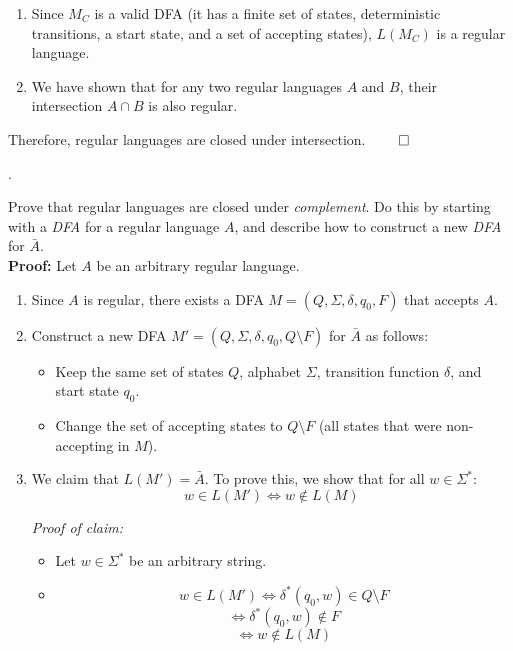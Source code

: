 \documentclass[12pt]{article}
\newcounter{quesnum}
\newcommand{\question}[2][??]{
\begin{list}{\labelitemi}{\leftmargin=2em}
\item [\arabic{quesnum}.] {} {#2}
\end{list}
\addtocounter{quesnum}{1}
}
\begin{document}
{\begin{enumerate}
    \item Since $M_C$ is a valid DFA (it has a finite set of states, deterministic transitions, a start state, and a set of accepting states), $L(M_C)$ is a regular language.
    
    \item We have shown that for any two regular languages $A$ and $B$, their intersection $A \cap B$ is also regular.
\end{enumerate}

Therefore, regular languages are closed under intersection. $\qed$
}


\vspace{12pt}

\question[3]{
Prove that regular languages are closed under \emph{complement}. Do this by starting with a \emph{DFA} for a regular language $A$, and describe how to construct a new \emph{DFA} for $\bar{A}$.
\\

\textbf{Proof:}  
Let $A$ be an arbitrary regular language.

\begin{enumerate}
    \item Since $A$ is regular, there exists a DFA $M = (Q, \Sigma, \delta, q_0, F)$ that accepts $A$.
    
    \item Construct a new DFA $M' = (Q, \Sigma, \delta, q_0, Q \setminus F)$ for $\bar{A}$ as follows:
    \begin{itemize}
        \item Keep the same set of states $Q$, alphabet $\Sigma$, transition function $\delta$, and start state $q_0$.
        \item Change the set of accepting states to $Q \setminus F$ (all states that were non-accepting in $M$).
    \end{itemize}
    
    \item We claim that $L(M') = \bar{A}$. To prove this, we show that for all $w \in \Sigma^*$:
    $$w \in L(M') \iff w \notin L(M)$$
    
    \textit{Proof of claim:}
    \begin{itemize}
        \item Let $w \in \Sigma^*$ be an arbitrary string.
        \item 
        $$w \in L(M') \iff \delta^*(q_0, w) \in Q \setminus F$$
        $$\iff \delta^*(q_0, w) \notin F$$
        $$\iff w \notin L(M)$$
    \end{itemize}
    

\end{enumerate}}
\end{document}
